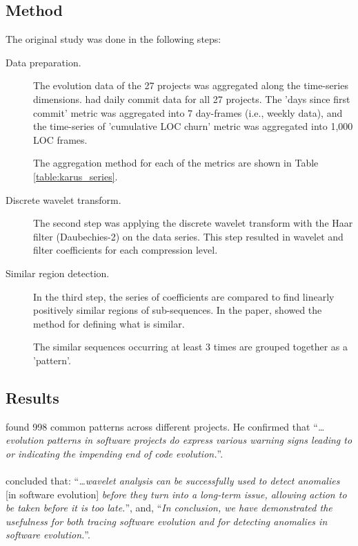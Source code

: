 

\subsection*{Method}
The original study was done in the following steps:
\begin{description}
	\item[Data preparation.] The evolution data of the 27 projects was aggregated
		along the time-series dimensions. \citeauthor{karus2013} had daily commit
		data for all 27 projects. The 'days since first commit' metric was aggregated
		into 7 day-frames (i.e., weekly data), and the time-series of 'cumulative LOC
		churn' metric was aggregated into 1,000 LOC frames.
		
		The aggregation method for each of the metrics are shown in Table
		\ref{table:karus_series}.
		
	\item[Discrete wavelet transform.] The second step was applying the discrete
		wavelet transform with the Haar filter (Daubechies-2) on the data series.
		This step resulted in wavelet and filter coefficients for each compression
		level.
		
	\item[Similar region detection.] In the third step, the series of coefficients
		are compared to find linearly positively similar regions of sub-sequences. In
		the paper, \citet{karus2013} showed the method for defining what is similar.

		The similar sequences occurring at least 3 times are grouped together as a
		'pattern'.
\end{description}

\subsection*{Results}
\citet{karus2013} found 998 common patterns across different projects. He
confirmed that ``\textit{\ldots{}evolution patterns in software projects do
express various warning signs leading to or indicating the impending end of
code evolution.}''.

\paragraph{}
\citeauthor{karus2013} concluded that: ``\textit{\ldots{}wavelet analysis can be
successfully used to detect anomalies} [in software evolution] \textit{before
they turn into a long-term issue, allowing action to be taken before it is too
late.}'', and, ``\textit{In conclusion, we have demonstrated the usefulness
for both tracing software evolution and for detecting anomalies in software
evolution.}''.

